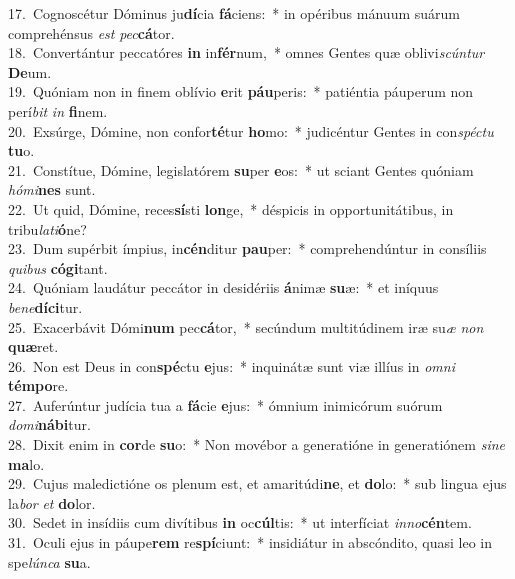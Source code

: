 {17.~}Cognoscétur Dóminus ju\textbf{dí}cia \textbf{fá}ciens:~* in opéribus mánuum suárum comprehénsus \textit{est} \textit{pec}\textbf{cá}tor.\\
{18.~}Convertántur peccatóres \textbf{in} in\textbf{fér}num,~* omnes Gentes quæ oblivi\textit{scún}\textit{tur} \textbf{De}um.\\
{19.~}Quóniam non in finem oblívio \textbf{e}rit \textbf{páu}peris:~* patiéntia páuperum non perí\textit{bit} \textit{in} \textbf{fi}nem.\\
{20.~}Exsúrge, Dómine, non confor\textbf{té}tur \textbf{ho}mo:~* judicéntur Gentes in con\textit{spé}\textit{ctu} \textbf{tu}o.\\
{21.~}Constítue, Dómine, legislatórem \textbf{su}per \textbf{e}os:~* ut sciant Gentes quóniam \textit{hó}\textit{mi}\textbf{nes} sunt.\\
{22.~}Ut quid, Dómine, reces\textbf{sí}sti \textbf{lon}ge,~* déspicis in opportunitátibus, in tribu\textit{la}\textit{ti}\textbf{ó}ne?\\
{23.~}Dum supérbit ímpius, in\textbf{cén}ditur \textbf{pau}per:~* comprehendúntur in consíliis \textit{qui}\textit{bus} \textbf{có}\textbf{gi}tant.\\
{24.~}Quóniam laudátur peccátor in desidériis \textbf{á}nimæ \textbf{su}æ:~* et iníquus \textit{be}\textit{ne}\textbf{dí}\textbf{ci}tur.\\
{25.~}Exacerbávit Dómi\textbf{num} pec\textbf{cá}tor,~* secúndum multitúdinem iræ su\textit{æ} \textit{non} \textbf{quæ}ret.\\
{26.~}Non est Deus in con\textbf{spé}ctu \textbf{e}jus:~* inquinátæ sunt viæ illíus in \textit{om}\textit{ni} \textbf{tém}\textbf{po}re.\\
{27.~}Auferúntur judícia tua a \textbf{fá}cie \textbf{e}jus:~* ómnium inimicórum suórum \textit{do}\textit{mi}\textbf{ná}\textbf{bi}tur.\\
{28.~}Dixit enim in \textbf{cor}de \textbf{su}o:~* Non movébor a generatióne in generatiónem \textit{si}\textit{ne} \textbf{ma}lo.\\
{29.~}Cujus maledictióne os plenum est, et amaritúdi\textbf{ne}, et \textbf{do}lo:~* sub lingua ejus la\textit{bor} \textit{et} \textbf{do}lor.\\
{30.~}Sedet in insídiis cum divítibus \textbf{in} oc\textbf{cúl}tis:~* ut interfíciat \textit{in}\textit{no}\textbf{cén}tem.\\
{31.~}Oculi ejus in páupe\textbf{rem} re\textbf{spí}ciunt:~* insidiátur in abscóndito, quasi leo in spe\textit{lún}\textit{ca} \textbf{su}a.\\

